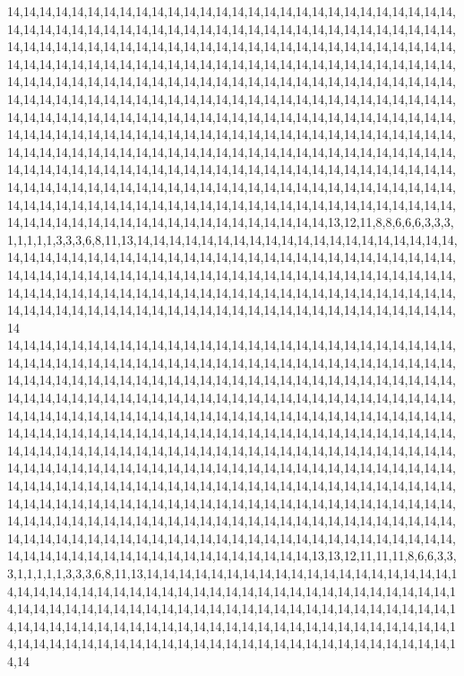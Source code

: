 14,14,14,14,14,14,14,14,14,14,14,14,14,14,14,14,14,14,14,14,14,14,14,14,14,14,14,14,14,14,14,14,14,14,14,14,14,14,14,14,14,14,14,14,14,14,14,14,14,14,14,14,14,14,14,14,14,14,14,14,14,14,14,14,14,14,14,14,14,14,14,14,14,14,14,14,14,14,14,14,14,14,14,14,14,14,14,14,14,14,14,14,14,14,14,14,14,14,14,14,14,14,14,14,14,14,14,14,14,14,14,14,14,14,14,14,14,14,14,14,14,14,14,14,14,14,14,14,14,14,14,14,14,14,14,14,14,14,14,14,14,14,14,14,14,14,14,14,14,14,14,14,14,14,14,14,14,14,14,14,14,14,14,14,14,14,14,14,14,14,14,14,14,14,14,14,14,14,14,14,14,14,14,14,14,14,14,14,14,14,14,14,14,14,14,14,14,14,14,14,14,14,14,14,14,14,14,14,14,14,14,14,14,14,14,14,14,14,14,14,14,14,14,14,14,14,14,14,14,14,14,14,14,14,14,14,14,14,14,14,14,14,14,14,14,14,14,14,14,14,14,14,14,14,14,14,14,14,14,14,14,14,14,14,14,14,14,14,14,14,14,14,14,14,14,14,14,14,14,14,14,14,14,14,14,14,14,14,14,14,14,14,14,14,14,14,14,14,14,14,14,14,14,14,14,14,14,14,14,14,14,14,14,14,14,14,14,14,14,14,14,14,14,14,14,14,14,14,14,14,14,14,14,14,14,14,14,14,14,14,14,14,14,14,14,14,14,14,14,14,14,14,14,14,14,14,13,12,11,8,8,6,6,6,3,3,3,1,1,1,1,1,3,3,3,6,8,11,13,14,14,14,14,14,14,14,14,14,14,14,14,14,14,14,14,14,14,14,14,14,14,14,14,14,14,14,14,14,14,14,14,14,14,14,14,14,14,14,14,14,14,14,14,14,14,14,14,14,14,14,14,14,14,14,14,14,14,14,14,14,14,14,14,14,14,14,14,14,14,14,14,14,14,14,14,14,14,14,14,14,14,14,14,14,14,14,14,14,14,14,14,14,14,14,14,14,14,14,14,14,14,14,14,14,14,14,14,14,14,14,14,14,14,14,14,14,14,14,14,14,14,14,14,14,14,14,14,14,14,14,14,14
14,14,14,14,14,14,14,14,14,14,14,14,14,14,14,14,14,14,14,14,14,14,14,14,14,14,14,14,14,14,14,14,14,14,14,14,14,14,14,14,14,14,14,14,14,14,14,14,14,14,14,14,14,14,14,14,14,14,14,14,14,14,14,14,14,14,14,14,14,14,14,14,14,14,14,14,14,14,14,14,14,14,14,14,14,14,14,14,14,14,14,14,14,14,14,14,14,14,14,14,14,14,14,14,14,14,14,14,14,14,14,14,14,14,14,14,14,14,14,14,14,14,14,14,14,14,14,14,14,14,14,14,14,14,14,14,14,14,14,14,14,14,14,14,14,14,14,14,14,14,14,14,14,14,14,14,14,14,14,14,14,14,14,14,14,14,14,14,14,14,14,14,14,14,14,14,14,14,14,14,14,14,14,14,14,14,14,14,14,14,14,14,14,14,14,14,14,14,14,14,14,14,14,14,14,14,14,14,14,14,14,14,14,14,14,14,14,14,14,14,14,14,14,14,14,14,14,14,14,14,14,14,14,14,14,14,14,14,14,14,14,14,14,14,14,14,14,14,14,14,14,14,14,14,14,14,14,14,14,14,14,14,14,14,14,14,14,14,14,14,14,14,14,14,14,14,14,14,14,14,14,14,14,14,14,14,14,14,14,14,14,14,14,14,14,14,14,14,14,14,14,14,14,14,14,14,14,14,14,14,14,14,14,14,14,14,14,14,14,14,14,14,14,14,14,14,14,14,14,14,14,14,14,14,14,14,14,14,14,14,14,14,14,14,14,14,14,14,14,14,14,14,14,14,14,13,13,12,11,11,11,8,6,6,3,3,3,1,1,1,1,1,3,3,3,6,8,11,13,14,14,14,14,14,14,14,14,14,14,14,14,14,14,14,14,14,14,14,14,14,14,14,14,14,14,14,14,14,14,14,14,14,14,14,14,14,14,14,14,14,14,14,14,14,14,14,14,14,14,14,14,14,14,14,14,14,14,14,14,14,14,14,14,14,14,14,14,14,14,14,14,14,14,14,14,14,14,14,14,14,14,14,14,14,14,14,14,14,14,14,14,14,14,14,14,14,14,14,14,14,14,14,14,14,14,14,14,14,14,14,14,14,14,14,14,14,14,14,14,14,14,14,14,14,14,14,14,14,14,14,14,14
